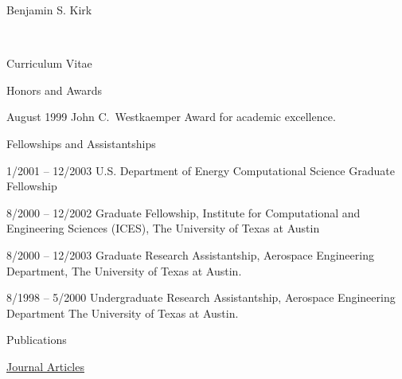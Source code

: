 \documentclass[10pt]{report}
\begin{document}
\begin{cv}{\centerline{\Large Benjamin S. Kirk}\\
    \centerline{\large Curriculum Vitae}}
\begin{cvlist}{Honors and Awards}
    \item[August 1999]
      John C.\ Westkaemper Award for academic excellence.
  \end{cvlist}


  \begin{cvlist}{Fellowships and Assistantships}
    \item[1/2001 -- 12/2003]
      U.S. Department of Energy Computational Science Graduate Fellowship
    \item[8/2000 -- 12/2002]
      Graduate Fellowship,
      Institute for Computational and Engineering Sciences (ICES),
      The University of Texas at Austin
    \item[8/2000 -- 12/2003]
      Graduate Research Assistantship,
      Aerospace Engineering Department,
      The University of Texas at Austin.
    \item[8/1998 -- 5/2000]
      Undergraduate Research Assistantship,
      Aerospace Engineering Department
      The University of Texas at Austin.
  \end{cvlist}
  
  
  \begin{cvlist}{Publications}

    \item[\underline{Journal Articles}]    


\end{cvlist}
\end{cv}
\end{document}
